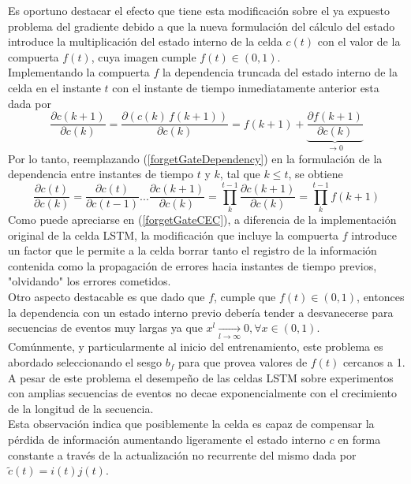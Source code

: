 \documentclass{article}
\begin{document}
	Es oportuno destacar el efecto que tiene esta modificación sobre el ya expuesto problema del gradiente debido a que la nueva formulación del cálculo del estado introduce la multiplicación del estado interno de la celda $c(t)$ con el valor de la compuerta $f(t)$, cuya imagen cumple $f(t) \in (0, 1)$.\\
	Implementando la compuerta $f$ la dependencia truncada del estado interno de la celda en el instante $t$ con el instante de tiempo inmediatamente anterior esta dada por
	\begin{equation}\label{forgetGateDependency}
	\dfrac{\partial c(k+1)}{\partial c(k)} = \dfrac{\partial (c(k) \, f(k+1))}{\partial c(k)} = f(k+1) + \underbrace{\dfrac{\partial f(k+1)}{\partial c(k)}}_{\rightarrow 0}
	\end{equation}
	Por lo tanto, reemplazando (\ref{forgetGateDependency}) en la formulación de la dependencia entre instantes de tiempo $t$ y $k$, tal que $k \le t$, se obtiene
	\begin{equation}\label{forgetGateCEC}
	\dfrac{\partial c(t)}{\partial c(k)} = \dfrac{\partial c(t)}{\partial c(t-1)} ... \dfrac{\partial c(k+1)}{\partial c(k)} = \prod_{k}^{t-1} \dfrac{\partial c(k+1)}{\partial c(k)} = \prod_{k}^{t-1} f(k+1)
	\end{equation}
	Como puede apreciarse en (\ref{forgetGateCEC}), a diferencia de la implementación original de la celda LSTM, la modificación que incluye la compuerta $f$ introduce un factor que le permite a la celda borrar tanto el registro de la información contenida como la propagación de errores hacia instantes de tiempo previos, "olvidando" los errores cometidos.\\
	Otro aspecto destacable es que dado que $f$, cumple que $f(t) \in (0, 1)$, entonces la dependencia con un estado interno previo debería tender a desvanecerse para secuencias de eventos muy largas ya que $x^l \xrightarrow[l \to \infty]{} 0, \forall x \in (0,1)$. \\
	Comúnmente, y particularmente al inicio del entrenamiento, este problema es abordado seleccionando el sesgo $b_f$ para que provea valores de $f(t)$ cercanos a 1. A pesar de este problema el desempeño de las celdas LSTM sobre experimentos con amplias secuencias de eventos no decae exponencialmente con el crecimiento de la longitud de la secuencia.\\
	Esta observación indica que posiblemente la celda es capaz de compensar la pérdida de información aumentando ligeramente el estado interno $c$ en forma constante a través de la actualización no recurrente del mismo dada por $\tilde{c}(t) = i(t)j(t)$.
	
\end{document}
